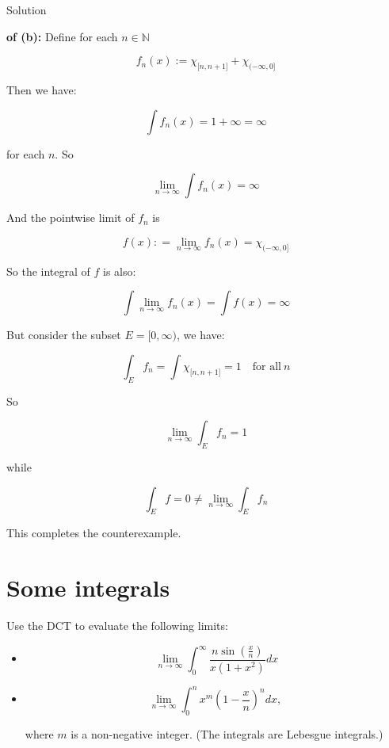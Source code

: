 \documentclass{qlnotes-export}
\begin{document}
\begin{qlsolution}{Solution}

\textbf{of (b):} Define for each \(n \in {\mathbb{N}}\)

\[f_{n}(x) := \chi_{\lbrack n,n + 1\rbrack} + \chi_{( - \infty,0\rbrack}\]

Then we have:

\[\int f_{n}(x) = 1 + \infty = \infty\]

for each \(n\). So

\[\lim\limits_{n\rightarrow\infty}\int f_{n}(x) = \infty\]

And the pointwise limit of \(f_{n}\) is

\[f(x): = \lim\limits_{n\rightarrow\infty}f_{n}(x) = \chi_{( - \infty,0\rbrack}\]

So the integral of \(f\) is also:

\[\int\lim\limits_{n\rightarrow\infty}f_{n}(x) = \int f(x) = \infty\]

But consider the subset \(E = \lbrack 0,\infty)\), we have:

\[\int_{E}f_{n} = \int\chi_{\lbrack n,n + 1\rbrack} = 1\quad\text{for all}\ n\]

So

\[\lim\limits_{n\rightarrow\infty}\int_{E}f_{n} = 1\]

while

\[\int_{E}f = 0 \neq \lim\limits_{n\rightarrow\infty}\int_{E}f_{n}\]

This completes the counterexample.

\end{qlsolution}

\section{Some integrals}\label{some-integrals}

Use the DCT to evaluate the following limits:

\begin{itemize}
\item
  \[\ \lim\limits_{n\rightarrow\infty}\int_{0}^{\infty}\frac{n\sin\left( \frac{x}{n} \right)}{x(1 + x^{2})} dx\]
\item
  \[\lim\limits_{n\rightarrow\infty}\int_{0}^{n}x^{m}\left( {1 - \frac{x}{n}} \right)^{n} dx,\]

  where \(m\) is a non-negative integer. (The integrals are Lebesgue integrals.)
\end{itemize}
\end{document}
